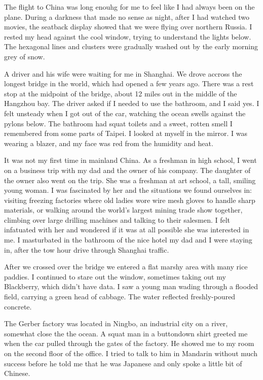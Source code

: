 The flight to China was long enouhg for me to feel like I had always been on the
plane.  During a darkness that made no sense as night, after I had watched two
movies, the seatback display showed that we were flying over northern Russia.  I
rested my head against the cool window, trying to understand the lights below.
The hexagonal lines and clusters were gradually washed out by the early morning
grey of snow.

A driver and his wife were waiting for me in Shanghai.  We drove accross the
longest bridge in the world, which had opened a few years ago.  There was a rest
stop at the midpoint of the bridge, about 12 miles out in the middle of the
Hangzhou bay.  The driver asked if I needed to use the bathroom, and I said yes.
I felt unsteady when I got out of the car, watching the ocean swells against the
pylons below.  The bathroom had squat toilets and a sweet, rotten smell I
remembered from some parts of Taipei.  I looked at myself in the mirror.  I was
wearing a blazer, and my face was red from the humidity and heat.

It was not my first time in mainland China.  As a freshman in high school, I
went on a business trip with my dad and the owner of his company.  The daughter
of the owner also went on the trip.  She was a freshman at art school, a tall,
smiling young woman.  I was fascinated by her and the situations we found
ourselves in: visiting freezing factories where old ladies wore wire mesh gloves
to handle sharp materials, or walking around the world's largest mining trade
show together, climbing over large drilling machines and talking to their
salesmen.  I felt infatuated with her and wondered if it was at all possible she
was interested in me.  I masturbated in the bathroom of the nice hotel my dad
and I were staying in, after the tow hour drive through Shanghai traffic.

After we crossed over the bridge we entered a flat marshy area with many rice
paddies.  I continued to stare out the window, sometimes taking out my
Blackberry, which didn't have data.  I saw a young man wading through a flooded
field, carrying a green head of cabbage.  The water reflected freshly-poured
concrete.  

The Gerber factory was located in Ningbo, an industrial city on a river,
somewhat close the the ocean.  A squat man in a buttondown shirt greeted me when
the car pulled through the gates of the factory.  He showed me to my room on the
second floor of the office.  I tried to talk to him in Mandarin without much
success before he told me that he was Japanese and only spoke a little bit of
Chinese.


